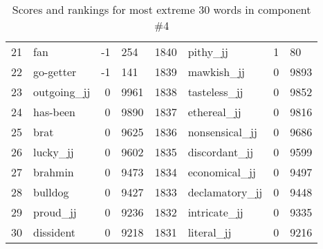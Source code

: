 \begin{table}[tbp]
\begin{tabular}{| rlr@{.}l | rlr@{.}l |}
    21 & fan & -1 & 254    &    1840 & pithy\_jj & 1 & 80 \\
    22 & go-getter & -1 & 141    &    1839 & mawkish\_jj & 0 & 9893 \\
    23 & outgoing\_jj & 0 & 9961    &    1838 & tasteless\_jj & 0 & 9852 \\
    24 & has-been & 0 & 9890    &    1837 & ethereal\_jj & 0 & 9816 \\
    25 & brat & 0 & 9625    &    1836 & nonsensical\_jj & 0 & 9686 \\
    26 & lucky\_jj & 0 & 9602    &    1835 & discordant\_jj & 0 & 9599 \\
    27 & brahmin & 0 & 9473    &    1834 & economical\_jj & 0 & 9497 \\
    28 & bulldog & 0 & 9427    &    1833 & declamatory\_jj & 0 & 9448 \\
    29 & proud\_jj & 0 & 9236    &    1832 & intricate\_jj & 0 & 9335 \\
    30 & dissident & 0 & 9218    &    1831 & literal\_jj & 0 & 9216 \\
    \hline
    \end{tabular}
    \caption{Scores and rankings for most extreme 30 words in component \#4} 
\end{table}
\clearpage
